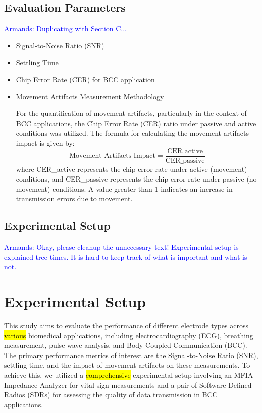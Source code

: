 \documentclass[conference]{IEEEtran}
\newcommand{\notea}[1]{\textcolor{blue}{Armands: #1}}
\begin{document}
\subsection{Evaluation Parameters}
\notea{Duplicating with Section C...}
\begin{itemize}
    \item Signal-to-Noise Ratio (SNR)
    \item Settling Time
    \item Chip Error Rate (CER) for BCC application
    \item Movement Artifacts Measurement Methodology
    
For the quantification of movement artifacts, particularly in the context of BCC applications, the Chip Error Rate (CER) ratio under passive and active conditions was utilized. The formula for calculating the movement artifacts impact is given by:
\begin{equation}
    \text{Movement Artifacts Impact} = \frac{\text{CER\_active}}{\text{CER\_passive}}
\end{equation}
where CER\_active represents the chip error rate under active (movement) conditions, and CER\_passive represents the chip error rate under passive (no movement) conditions. A value greater than 1 indicates an increase in transmission errors due to movement.

\end{itemize}

\subsection{Experimental Setup}
\notea{Okay, please cleanup the unnecessary text! Experimental setup is explained tree times. It is hard to keep track of what is important and what is not.}
\section{Experimental Setup}

This study aims to evaluate the performance of different electrode types across \hl{various} biomedical applications, including electrocardiography (ECG), breathing measurement, pulse wave analysis, and Body-Coupled Communication (BCC). The primary performance metrics of interest are the Signal-to-Noise Ratio (SNR), settling time, and the impact of movement artifacts on these measurements. To achieve this, we utilized a \hl{comprehensive} experimental setup involving an MFIA Impedance Analyzer for vital sign measurements and a pair of Software Defined Radios (SDRs) for assessing the quality of data transmission in BCC applications.
\end{document}
